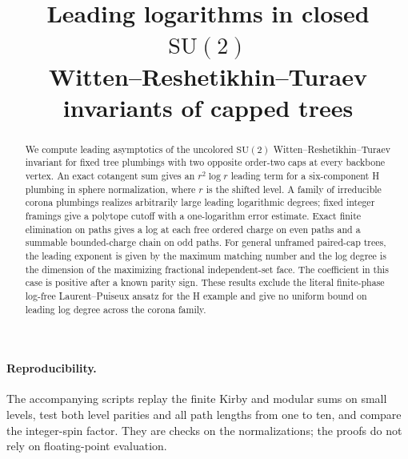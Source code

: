 \documentclass[11pt]{article}
\title{Leading logarithms in closed \(\mathrm{SU}(2)\)\\Witten--Reshetikhin--Turaev invariants of capped trees}
\author{}
\date{}
\begin{document}
\maketitle
\begin{abstract}
We compute leading asymptotics of the uncolored \(\mathrm{SU}(2)\) Witten--Reshetikhin--Turaev invariant for fixed tree plumbings with two opposite order-two caps at every backbone vertex. An exact cotangent sum gives an \(r^2\log r\) leading term for a six-component H plumbing in sphere normalization, where \(r\) is the shifted level. A family of irreducible corona plumbings realizes arbitrarily large leading logarithmic degrees; fixed integer framings give a polytope cutoff with a one-logarithm error estimate. Exact finite elimination on paths gives a log at each free ordered charge on even paths and a summable bounded-charge chain on odd paths. For general unframed paired-cap trees, the leading exponent is given by the maximum matching number and the log degree is the dimension of the maximizing fractional independent-set face. The coefficient in this case is positive after a known parity sign. These results exclude the literal finite-phase log-free Laurent--Puiseux ansatz for the H example and give no uniform bound on leading log degree across the corona family.
\end{abstract}










\paragraph{Reproducibility.}
The accompanying scripts replay the finite Kirby and modular sums on small levels, test both level parities and all path lengths from one to ten, and compare the integer-spin factor. They are checks on the normalizations; the proofs do not rely on floating-point evaluation.
\end{document}
